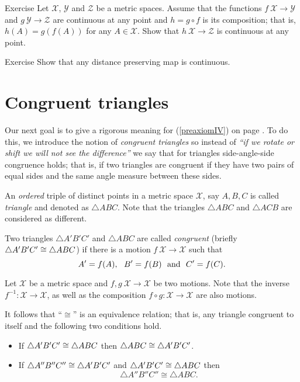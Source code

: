 \begin{thm}{Exercise}\label{ex:comp+cont}
Let $\mathcal{X}$, $\mathcal{Y}$ and $\mathcal{Z}$ be a metric spaces.
Assume that the functions $f\:\mathcal{X}\to\mathcal{Y}$
and $g\:\mathcal{Y}\to\mathcal{Z}$ are continuous at any point
and $h=g\circ f$ is its composition;
that is, $h(A)=g(f(A))$ for any $A\in \mathcal{X}$.
Show that $h\:\mathcal{X}\to\mathcal{Z}$ is continuous at any point.
\end{thm}

\begin{thm}{Exercise}\label{ex:isom-cont}
Show that any distance preserving map is continuous.
\end{thm}




\section*{Congruent triangles} 

Our next goal is to give a rigorous meaning for  (\ref{preaxiomIV}) on page \pageref{preaxiomIV}.
To do this, we introduce the notion of {}\emph{congruent triangles}
so instead of {}\emph{``if we rotate or shift we will not see the difference''} we say that for triangles side-angle-side congruence holds;
that is, if two triangles are congruent if they have two pairs of equal sides and the same angle measure between these sides.

An {}\emph{ordered} triple of distinct points in a metric space $\mathcal{X}$, 
say $A,B,C$
is called \emph{triangle}\label{page:def:triangle} and denoted as $\triangle A B C$.
Note that the triangles $\triangle A B C$ and $\triangle A C B$ are considered as different.

Two triangles $\triangle A' B' C'$ and $\triangle A B C$ are called 
\emph{congruent}
(briefly $\triangle A' B' C'\z\cong\triangle A B C$) if there is a motion $f\:\mathcal{X}\to\mathcal{X}$ such that 
\[A'\z=f(A),\ \  B'=f(B)\ \ \text{and}\ \ C'=f(C).\]

Let $\mathcal X$ be a metric space
and $f,g\:\mathcal X\to\mathcal X$ be two motions.
Note that the inverse $f^{-1}:\mathcal X\to\mathcal X$,
as well as the composition $f\circ g:\mathcal X\to\mathcal X$
are also motions.

It follows that ``$\cong$'' is an equivalence relation;
that is, any triangle congruent to itself and the following two conditions hold.
\begin{itemize} 
\item If $\triangle A' B' C'\z\cong\triangle A B C$ then $\triangle A B C\z\cong\triangle A' B' C'$.
\item If $\triangle A'' B'' C''\z\cong\triangle A' B' C'$ and $\triangle A' B' C'\z\cong\triangle A B C$ 
then 
$$\triangle A'' B'' C''\cong\triangle A B C.$$
\end{itemize}


